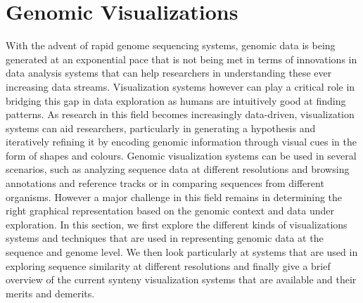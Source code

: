 \section{Genomic Visualizations} 
With the advent of rapid genome sequencing systems, genomic data is being generated at an exponential pace that is not being met in terms of innovations in data analysis systems that can help researchers in understanding these ever increasing data streams. Visualization systems however can play a critical role in bridging this gap in data exploration as humans are intuitively good at finding patterns. As research in this field becomes increasingly data-driven, visualization systems can aid researchers, particularly in generating a hypothesis and iteratively refining it by encoding genomic information through visual cues in the form of shapes and colours\cite{nusrat2019tasks}. Genomic visualization systems can be used in several scenarios, such as analyzing sequence data at different resolutions and browsing annotations and reference tracks or in comparing sequences from different organisms\cite{nielsen2010visualizing}. However a major challenge in this field remains in determining the right graphical representation based on the genomic context and data under exploration. In this section, we first explore the different kinds of visualizations systems and techniques that are used in representing genomic data at the sequence and genome level. We then look particularly at systems that are used in exploring sequence similarity at different resolutions and finally give a brief overview of the current synteny visualization systems that are available and their merits and demerits.

